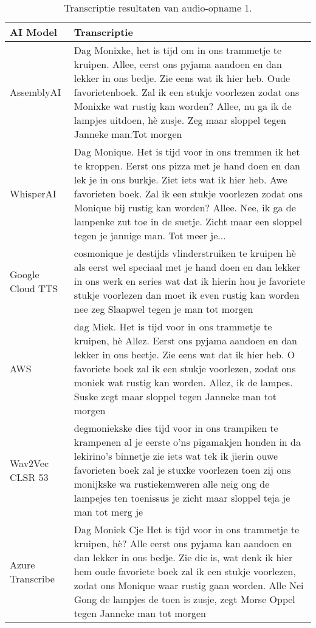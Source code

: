 \begin{table}[htbp]
    \centering
    \label{tab:results_sample1}
    \caption{Transcriptie resultaten van audio-opname 1.}
    \begin{tabularx}{\textwidth}{|l|X|}
        \hline
        \textbf{AI Model} & \textbf{Transcriptie} \\ \midrule

        AssemblyAI &    Dag Monixke, het is tijd om in ons trammetje te kruipen. Allee, eerst ons pyjama aandoen en dan lekker in ons bedje. Zie eens wat ik hier heb. Oude favorietenboek. Zal ik een stukje voorlezen zodat ons Monixke wat rustig kan worden? Allee, nu ga ik de lampjes uitdoen, hè zusje. Zeg maar sloppel tegen Janneke man.Tot morgen\\
        \hline
        
        WhisperAI & Dag Monique. Het is tijd voor in ons tremmen ik het te kroppen. Eerst ons pizza met je hand doen en dan lek je in ons burkje. Ziet iets wat ik hier heb. Awe favorieten boek. Zal ik een stukje voorlezen zodat ons Monique bij rustig kan worden? Allee. Nee, ik ga de lampenke zut toe in de suetje. Zicht maar een sloppel tegen je jannige man. Tot meer je...\\
        \hline
        
        Google Cloud TTS &         cosmonique je destijds vlinderstruiken te kruipen hè als eerst wel speciaal met je hand doen en dan lekker in ons werk en series wat dat ik hierin hou je favoriete stukje voorlezen dan moet ik even rustig kan worden nee zeg Slaapwel tegen je man tot morgen
         \\ \hline
        
        AWS &    dag Miek. Het is tijd voor in ons trammetje te kruipen, hè Allez. Eerst ons pyjama aandoen en dan lekker in ons beetje. Zie eens wat dat ik hier heb. O favoriete boek zal ik een stukje voorlezen, zodat ons moniek wat rustig kan worden. Allez, ik de lampes. Suske zegt maar sloppel tegen Janneke man tot morgen
         \\ \hline
        
       Wav2Vec CLSR 53 &     degmoniekske dies tijd voor in ons trampiken te krampenen al je eerste o'ns pigamakjen honden in da lekirino's binnetje zie iets wat tek ik jierin ouwe favorieten boek zal je stuxke voorlezen toen zij ons monijkske wa rustiekemweren alle neig ong de lampejes ten toenissus je zicht maar sloppel teja je man tot merg je
         \\ \hline
        
        Azure Transcribe & Dag Moniek Cje Het is tijd voor in ons trammetje te kruipen, hè? Alle eerst ons pyjama kan aandoen en dan lekker in ons bedje. Zie die is, wat denk ik hier hem oude favoriete boek zal ik een stukje voorlezen, zodat ons Monique waar rustig gaan worden. Alle Nei Gong de lampjes de toen is zusje, zegt Morse Oppel tegen Janneke man tot morgen
         \\ \hline
    \end{tabularx}
\end{table}
\FloatBarrier
